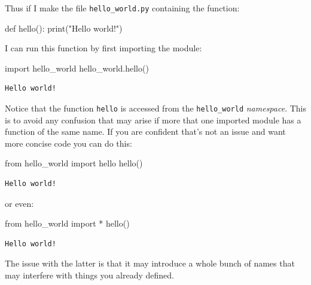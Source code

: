 \documentclass[
  letterpaper,
  DIV=11,
  numbers=noendperiod]{scrreprt}
\newenvironment{Shaded}{\begin{snugshade}}{\end{snugshade}}
\newcommand{\BuiltInTok}[1]{\textcolor[rgb]{0.00,0.23,0.31}{#1}}
\newcommand{\ImportTok}[1]{\textcolor[rgb]{0.00,0.46,0.62}{#1}}
\newcommand{\KeywordTok}[1]{\textcolor[rgb]{0.00,0.23,0.31}{#1}}
\newcommand{\NormalTok}[1]{\textcolor[rgb]{0.00,0.23,0.31}{#1}}
\newcommand{\OperatorTok}[1]{\textcolor[rgb]{0.37,0.37,0.37}{#1}}
\newcommand{\StringTok}[1]{\textcolor[rgb]{0.13,0.47,0.30}{#1}}
\theoremstyle{definition}
\theoremstyle{remark}
\begin{document}
Thus if I make the file \texttt{hello\_world.py} containing the
function:

\begin{Shaded}
\begin{Highlighting}[]
\KeywordTok{def}\NormalTok{ hello():}
    \BuiltInTok{print}\NormalTok{(}\StringTok{"Hello world!"}\NormalTok{)}
\end{Highlighting}
\end{Shaded}

I can run this function by first importing the module:

\begin{Shaded}
\begin{Highlighting}[]
\ImportTok{import}\NormalTok{ hello\_world}
\NormalTok{hello\_world.hello()}
\end{Highlighting}
\end{Shaded}

\begin{verbatim}
Hello world!
\end{verbatim}

Notice that the function \texttt{hello} is accessed from the
\texttt{hello\_world} \emph{namespace}. This is to avoid any confusion
that may arise if more that one imported module has a function of the
same name. If you are confident that's not an issue and want more
concise code you can do this:

\begin{Shaded}
\begin{Highlighting}[]
\ImportTok{from}\NormalTok{ hello\_world }\ImportTok{import}\NormalTok{ hello}
\NormalTok{hello()}
\end{Highlighting}
\end{Shaded}

\begin{verbatim}
Hello world!
\end{verbatim}

or even:

\begin{Shaded}
\begin{Highlighting}[]
\ImportTok{from}\NormalTok{ hello\_world }\ImportTok{import} \OperatorTok{*}
\NormalTok{hello()}
\end{Highlighting}
\end{Shaded}

\begin{verbatim}
Hello world!
\end{verbatim}

The issue with the latter is that it may introduce a whole bunch of
names that may interfere with things you already defined.
\end{document}

